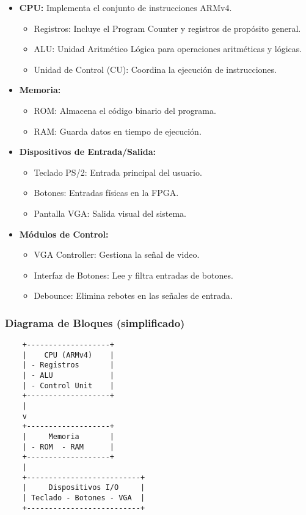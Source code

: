 \documentclass[conference]{IEEEtran}
\begin{document}
\begin{itemize}
	\item \textbf{CPU:} Implementa el conjunto de instrucciones ARMv4.
	\begin{itemize}
		\item Registros: Incluye el Program Counter y registros de propósito general.
		\item ALU: Unidad Aritmético Lógica para operaciones aritméticas y lógicas.
		\item Unidad de Control (CU): Coordina la ejecución de instrucciones.
	\end{itemize}
	
	\item \textbf{Memoria:}
	\begin{itemize}
		\item ROM: Almacena el código binario del programa.
		\item RAM: Guarda datos en tiempo de ejecución.
	\end{itemize}
	
	\item \textbf{Dispositivos de Entrada/Salida:}
	\begin{itemize}
		\item Teclado PS/2: Entrada principal del usuario.
		\item Botones: Entradas físicas en la FPGA.
		\item Pantalla VGA: Salida visual del sistema.
	\end{itemize}
	
	\item \textbf{Módulos de Control:}
	\begin{itemize}
		\item VGA Controller: Gestiona la señal de video.
		\item Interfaz de Botones: Lee y filtra entradas de botones.
		\item Debounce: Elimina rebotes en las señales de entrada.
	\end{itemize}
\end{itemize}

\subsubsection*{Diagrama de Bloques (simplificado)}

\begin{verbatim}
	+-------------------+
	|    CPU (ARMv4)    |
	| - Registros       |
	| - ALU             |
	| - Control Unit    |
	+-------------------+
	|
	v
	+-------------------+
	|     Memoria       |
	| - ROM  - RAM      |
	+-------------------+
	|
	+--------------------------+
	|     Dispositivos I/O     |
	| Teclado - Botones - VGA  |
	+--------------------------+
\end{verbatim}
\end{document}

